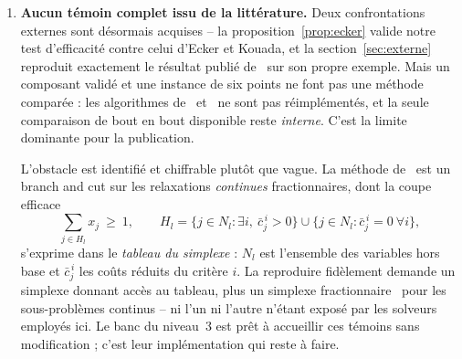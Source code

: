 \documentclass[11pt,a4paper]{article}
\theoremstyle{plain}
\theoremstyle{remark}
\begin{document}
\begin{enumerate}[leftmargin=*,itemsep=3pt]
\item \textbf{Aucun témoin complet issu de la littérature.} Deux
      confrontations externes sont désormais acquises -- la
      proposition~\ref{prop:ecker} valide notre test d'efficacité contre
      celui d'Ecker et Kouada, et la section~\ref{sec:externe} reproduit
      exactement le résultat publié de~\cite{zerdani2011} sur son propre
      exemple. Mais un composant validé et une instance de six points ne font
      pas une méthode comparée : les algorithmes de~\cite{zerdani2011}
      et~\cite{drici2018} ne sont pas réimplémentés, et la seule comparaison
      de bout en bout disponible reste \emph{interne}. C'est la limite
      dominante pour la publication.

      L'obstacle est identifié et chiffrable plutôt que vague. La méthode
      de~\cite{drici2018} est un branch and cut sur les relaxations
      \emph{continues} fractionnaires, dont la coupe efficace
      \[
        \sum_{j\in H_l}x_j\ \ge\ 1,\qquad
        H_l=\{j\in N_l:\exists i,\ \bar c^{\,i}_j>0\}
             \cup\{j\in N_l:\bar c^{\,i}_j=0\ \forall i\},
      \]
      s'exprime dans le \emph{tableau du simplexe} : $N_l$ est l'ensemble des
      variables hors base et $\bar c^{\,i}_j$ les coûts réduits du critère
      $i$. La reproduire fidèlement demande un simplexe donnant accès au
      tableau, plus un simplexe fractionnaire~\cite{martos1975,cambini1992}
      pour les sous-problèmes continus -- ni l'un ni l'autre n'étant exposé
      par les solveurs employés ici. Le banc du niveau~3 est prêt à accueillir
      ces témoins sans modification ; c'est leur implémentation qui reste à
      faire.


\end{enumerate}
\end{document}
